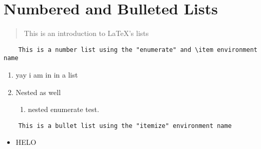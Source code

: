 \documentclass[12pt]{article}
\theoremstyle{plain} %
\theoremstyle{definition}
\theoremstyle{remark}
\begin{document}
\section{Numbered and Bulleted Lists}
\begin{quote}
    This is an introduction to \LaTeX's lists
\end{quote}
\begin{verbatim}
    This is a number list using the "enumerate" and \item environment name
\end{verbatim}
\begin{enumerate}
\item yay i am in in a list
\item Nested as well 
    \begin{enumerate}
        \item nested enumerate test.
    \end{enumerate}
\end{enumerate}

\begin{verbatim}
    This is a bullet list using the "itemize" environment name
\end{verbatim}    
\begin{itemize}
    \item HELO
\end{itemize}
\end{document}
